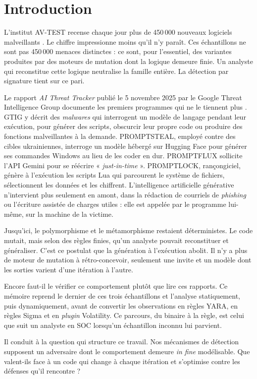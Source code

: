 \chapter*{Introduction}

L'institut AV-TEST recense chaque jour plus de 450\,000 nouveaux logiciels
malveillants \cite{avtest}. Le chiffre impressionne moins qu'il n'y paraît. Ces
échantillons ne sont pas 450\,000 menaces distinctes : ce sont, pour l'essentiel,
des variantes produites par des moteurs de mutation dont la logique demeure finie.
Un analyste qui reconstitue cette logique neutralise la famille entière. La
détection par signature tient sur ce pari.

Le rapport \emph{AI Threat Tracker} publié le 5 novembre 2025 par le Google Threat
Intelligence Group documente les premiers programmes qui ne le tiennent plus
\cite{gtigAI}. GTIG y décrit des \emph{malwares} qui interrogent un modèle de
langage pendant leur exécution, pour générer des scripts, obscurcir leur propre
code ou produire des fonctions malveillantes à la demande. PROMPTSTEAL, employé
contre des cibles ukrainiennes, interroge un modèle hébergé sur Hugging Face pour
générer ses commandes Windows au lieu de les coder en dur. PROMPTFLUX sollicite
l'API Gemini pour se réécrire « \emph{just-in-time} ». PROMPTLOCK, rançongiciel,
génère à l'exécution les scripts Lua qui parcourent le système de fichiers,
sélectionnent les données et les chiffrent. L'intelligence artificielle générative
n'intervient plus seulement en amont, dans la rédaction de courriels de
\emph{phishing} ou l'écriture assistée de charges utiles : elle est appelée par le
programme lui-même, sur la machine de la victime.

Jusqu'ici, le polymorphisme et le métamorphisme restaient déterministes. Le code
mutait, mais selon des règles finies, qu'un analyste pouvait reconstituer et
généraliser. C'est ce postulat que la génération à l'exécution abolit. Il n'y a
plus de moteur de mutation à rétro-concevoir, seulement une invite et un modèle
dont les sorties varient d'une itération à l'autre.

Encore faut-il le vérifier ce comportement plutôt que lire ces rapports. Ce mémoire reprend le
dernier de ces trois échantillons et l'analyse statiquement, puis dynamiquement,
avant de convertir les observations en règles YARA, en règles Sigma et en
\emph{plugin} Volatility. Ce parcours, du binaire à la règle, est celui que suit un
analyste en SOC lorsqu'un échantillon inconnu lui parvient.

Il conduit à la question qui structure ce travail. Nos mécanismes de détection
supposent un adversaire dont le comportement demeure \emph{in fine} modélisable.
Que valent-ils face à un code qui change à chaque itération et s'optimise contre
les défenses qu'il rencontre ?